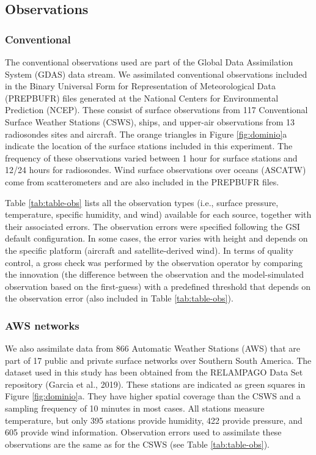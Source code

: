 \documentclass[final,5p,times,twocolumn,authoryear]{elsarticle} %
\begin{document}
\hypertarget{observations}{%
\subsection{Observations}\label{observations}}

\hypertarget{conventional}{%
\subsubsection{Conventional}\label{conventional}}

The conventional observations used are part of the Global Data Assimilation System (GDAS) data stream. We assimilated conventional observations included in the Binary Universal Form for Representation of Meteorological Data (PREPBUFR) files generated at the National Centers for Environmental Prediction (NCEP). These consist of surface observations from 117 Conventional Surface Weather Stations (CSWS), ships, and upper-air observations from 13 radiosondes sites and aircraft. The orange triangles in Figure \ref{fig:dominio}a indicate the location of the surface stations included in this experiment. The frequency of these observations varied between 1 hour for surface stations and 12/24 hours for radiosondes. Wind surface observations over oceans (ASCATW) come from scatterometers and are also included in the PREPBUFR files.

Table \ref{tab:table-obs} lists all the observation types (i.e., surface pressure, temperature, specific humidity, and wind) available for each source, together with their associated errors. The observation errors were specified following the GSI default configuration. In some cases, the error varies with height and depends on the specific platform (aircraft and satellite-derived wind). In terms of quality control, a gross check was performed by the observation operator by comparing the innovation (the difference between the observation and the model-simulated observation based on the first-guess) with a predefined threshold that depends on the observation error (also included in Table \ref{tab:table-obs}).

\hypertarget{aws-networks}{%
\subsubsection{AWS networks}\label{aws-networks}}

We also assimilate data from 866 Automatic Weather Stations (AWS) that are part of 17 public and private surface networks over Southern South America. The dataset used in this study has been obtained from the RELAMPAGO Data Set repository (Garcia et al., 2019). These stations are indicated as green squares in Figure \ref{fig:dominio}a. They have higher spatial coverage than the CSWS and a sampling frequency of 10 minutes in most cases. All stations measure temperature, but only 395 stations provide humidity, 422 provide pressure, and 605 provide wind information.
Observation errors used to assimilate these observations are the same as for the CSWS (see Table \ref{tab:table-obs}).
\end{document}
